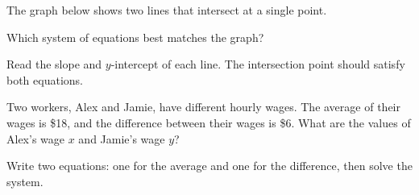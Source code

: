 \documentclass{ximera}
\begin{document}
\begin{problem}
The graph below shows two lines that intersect at a single point.

\begin{center}
\end{center}

Which system of equations best matches the graph?
\begin{hint}
Read the slope and $y$-intercept of each line. The intersection point should satisfy both equations.
\end{hint}
\begin{multipleChoice}
\end{multipleChoice}
\end{problem}

\begin{problem}
Two workers, Alex and Jamie, have different hourly wages. The average of their wages is \$18, and the difference between their wages is \$6. What are the values of Alex's wage $x$ and Jamie's wage $y$?
\begin{hint}
Write two equations: one for the average and one for the difference, then solve the system.
\end{hint}
\begin{multipleChoice}
\end{multipleChoice}
\end{problem}
\end{document}
